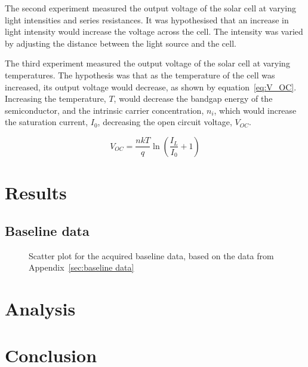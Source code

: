 \documentclass[a4paper,11pt]{article}
\begin{document}
The second experiment measured the output voltage of the solar cell at varying light intensities and series resistances. It was hypothesised that an increase in light intensity would increase the voltage across the cell. The intensity was varied by adjusting the distance between the light source and the cell.

The third experiment measured the output voltage of the solar cell at varying temperatures. The hypothesis was that as the temperature of the cell was increased, its output voltage would decrease, as shown by equation~\ref{eq:V_OC}. Increasing the temperature, $T$, would decrease the bandgap energy of the semiconductor, and the intrinsic carrier concentration, $n_i$, which would increase the saturation current, $I_0$, decreasing the open circuit voltage, $V_{OC}$.

\begin{equation} \label{eq:V_OC}
V_{OC} = \frac{nkT}{q}\ln{\left(\frac{I_L}{I_0} + 1\right)}
\end{equation}


\section{Results}
\subsection{Baseline data}
\begin{figure}
\label{plot:baseline}
\caption{Scatter plot for the acquired baseline data, based on the data from Appendix~\ref{sec:baseline data}}
\end{figure}

\section{Analysis}


\section{Conclusion}
\end{document}

